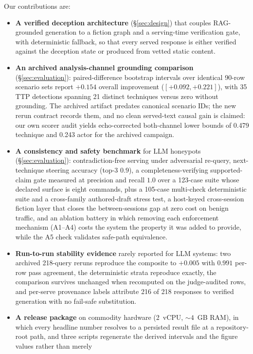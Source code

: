 \noindent Our contributions are:
\begin{itemize}
\item \textbf{A verified deception architecture} (\S\ref{sec:design}) that
couples RAG-grounded generation to a fiction graph and a serving-time
verification gate, with deterministic fallback, so that every served
response is either verified against the deception state or produced from
vetted static content.
\item \textbf{An archived analysis-channel grounding comparison}
(\S\ref{sec:evaluation}): paired-difference bootstrap intervals over
identical 90-row scenario sets report $+0.154$ overall improvement
($[+0.092, +0.221]$), with 35 TTP detections spanning 21 distinct techniques
versus zero without grounding. The archived artifact predates canonical
scenario IDs; the new rerun contract records them, and no clean served-text
causal gain is claimed: our own scorer audit yields echo-corrected
both-channel lower bounds of 0.479 technique and 0.243 actor for the archived
campaign.
\item \textbf{A consistency and safety benchmark} for LLM honeypots
(\S\ref{sec:evaluation}): contradiction-free serving under adversarial
re-query, next-technique steering accuracy (top-3 $0.9$), a
completeness-verifying supported-claim gate measured at precision and
recall $1.0$ over a 123-case suite whose declared surface is eight
commands, plus a 105-case multi-check
deterministic suite and a cross-family authored-draft stress test, a
host-keyed cross-session fiction layer that
closes the between-sessions gap at zero cost on benign traffic, and an
ablation battery in which removing each
enforcement mechanism (A1--A4) costs the system the property it was
added to provide, while the A5 check validates safe-path equivalence.
\item \textbf{Run-to-run stability evidence} rarely reported for LLM
systems: two archived 218-query reruns reproduce the composite to
$+0.005$ with $0.991$ per-row pass agreement, the deterministic
strata reproduce exactly, the comparison survives unchanged when
recomputed on the judge-audited rows, and per-serve provenance labels
attribute 216 of 218 responses to verified generation with no fail-safe
substitution.
\item \textbf{A release package} on commodity hardware
(2~vCPU, ${\sim}4$~GB RAM), in which every headline number resolves to a
persisted result file at a repository-root path, and three scripts
regenerate the derived intervals and the figure values rather than merely

\end{itemize}
